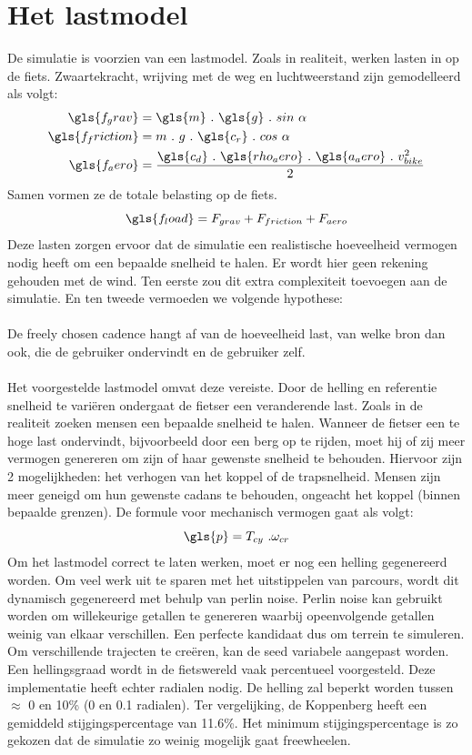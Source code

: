 \section{Het lastmodel}
De simulatie is voorzien van een lastmodel. Zoals in realiteit, werken lasten in op de fiets. Zwaartekracht, wrijving met de weg en luchtweerstand zijn gemodelleerd als volgt:
\\
\begin{align*}
\gls{f_grav}&=\gls{m} \ . \ \gls{g} \ . \ sin \ \alpha \\
\gls{f_friction}&=m \ . \ g \ . \ \gls{c_r} \ . \ cos \ \alpha \\
\gls{f_aero}&=\frac{\gls{c_d} \ . \ \gls{rho_aero} \ . \ \gls{a_aero} \ . \ v_{bike}^2}{2}
\end{align*}
Samen vormen ze de totale belasting op de fiets.
\[\gls{f_load} = F_{grav}+F_{friction}+F_{aero}\]
Deze lasten zorgen ervoor dat de simulatie een realistische hoeveelheid vermogen nodig heeft om een bepaalde snelheid te halen. Er wordt hier geen rekening gehouden met de wind. Ten eerste zou dit extra complexiteit toevoegen aan de simulatie. En ten tweede vermoeden we volgende hypothese:
\\\\
\tab De freely chosen cadence hangt af van de hoeveelheid last, van welke bron dan \tab ook, die de gebruiker ondervindt en de gebruiker zelf.
\\\\
Het voorgestelde lastmodel omvat deze vereiste. Door de helling en referentie snelheid te variëren ondergaat de fietser een veranderende last. Zoals in de realiteit zoeken mensen een bepaalde snelheid te halen. Wanneer de fietser een te hoge last ondervindt, bijvoorbeeld door een berg op te rijden, moet hij of zij meer vermogen genereren om zijn of haar gewenste snelheid te behouden. Hiervoor zijn 2 mogelijkheden: het verhogen van het koppel of de trapsnelheid. Mensen zijn meer geneigd om hun gewenste cadans te behouden, ongeacht het koppel (binnen bepaalde grenzen). De formule voor mechanisch vermogen gaat als volgt:
\[\gls{p}=T_{cy} \ . \omega_{cr} \]
Om het lastmodel correct te laten werken, moet er nog een helling gegenereerd worden. Om veel werk uit te sparen met het uitstippelen van parcours, wordt dit dynamisch gegenereerd met behulp van perlin noise. Perlin noise kan gebruikt worden om willekeurige getallen te genereren waarbij opeenvolgende getallen weinig van elkaar verschillen. Een perfecte kandidaat dus om terrein te simuleren. Om verschillende trajecten te creëren, kan de seed variabele aangepast worden. Een hellingsgraad wordt in de fietswereld vaak percentueel voorgesteld. Deze implementatie heeft echter radialen nodig. De helling zal beperkt worden tussen $\approx$ 0 en 10\% (0 en 0.1 radialen). Ter vergelijking, de Koppenberg heeft een gemiddeld stijgingspercentage van 11.6\%. Het minimum stijgingspercentage is zo gekozen dat de simulatie zo weinig mogelijk gaat freewheelen.
